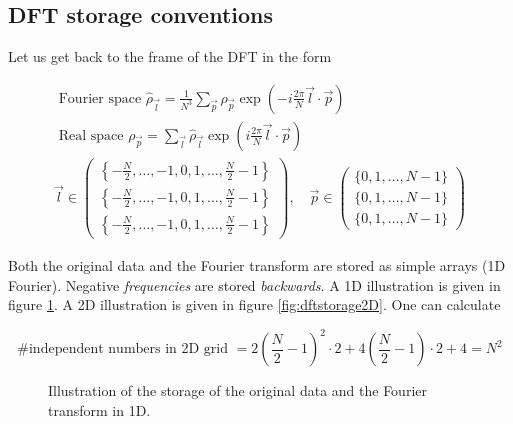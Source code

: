 \subsection{DFT storage conventions}
Let us get back to the frame of the DFT in the form

\begin{equation}
    \boxed{
    \begin{gathered}
    \text { Fourier space } \hat{\rho}_{\vec{l}}=\frac{1}{N^3} \sum_{\vec{p}} \rho_{\vec{p}} \exp \left(-i \frac{2 \pi}{N} \vec{l} \cdot \vec{p}\right) \\
    \text { Real space } \rho_{\vec{p}}=\sum_{\vec{l}} \hat{\rho}_{\vec{l}} \exp \left(i \frac{2 \pi}{N} \vec{l} \cdot \vec{p}\right) \\
    \vec{l}\in\left(\begin{array}{l}
        \left\{-\frac{N}{2}, \ldots,-1,0,1, \ldots, \frac{N}{2}-1\right\} \\
        \left\{-\frac{N}{2}, \ldots,-1,0,1, \ldots, \frac{N}{2}-1\right\} \\
        \left\{-\frac{N}{2}, \ldots,-1,0,1, \ldots, \frac{N}{2}-1\right\}
    \end{array}\right), \quad \vec{p} \in \left(\begin{array}{l}
        \{0,1, \ldots, N-1\} \\
        \{0,1, \ldots, N-1\} \\
        \{0,1, \ldots, N-1\}
        \end{array}\right)
    \end{gathered}
    }
\end{equation}

Both the original data and the Fourier transform are stored as simple arrays (1D Fourier).
Negative \textit{frequencies} are stored \textit{backwards}. A 1D illustration is given 
in figure \ref{fig:dftstorage1D}. A 2D illustration is given in figure \ref{fig:dftstorage2D}.
One can calculate

\begin{equation}
    \text{\# independent numbers in 2D grid } = 2\left(\frac{N}{2}-1\right)^2 \cdot 2+4\left(\frac{N}{2}-1\right) \cdot 2+4=N^2
\end{equation}

\begin{figure}[ht]
    \centering
    
    \caption{Illustration of the storage of the original data and the Fourier transform
    in 1D.}
    \label{fig:dftstorage1D}
\end{figure}

